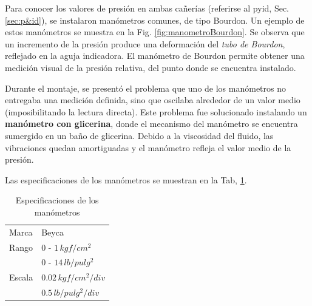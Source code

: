 Para conocer los valores de presión en ambas cañerías
(referirse al \gls{pyid}, Sec. \ref{sec:p&id}),
se instalaron manómetros comunes, de tipo Bourdon.
Un ejemplo de estos manómetros se muestra en la Fig. \ref{fig:manometroBourdon}.
Se observa que un incremento de la presión produce una deformación
del \emph{tubo de Bourdon}, reflejado en la aguja indicadora.
El manómetro de Bourdon permite obtener una medición visual de la
presión relativa, del punto donde se encuentra instalado.

Durante el montaje, se presentó el problema que uno de los manómetros
no entregaba una medición definida, sino que oscilaba alrededor de un
valor medio (imposibilitando la lectura directa).
Este problema fue solucionado instalando un \textbf{manómetro con glicerina},
donde el mecanismo del manómetro se encuentra sumergido en un baño de glicerina.
Debido a la viscosidad del fluido, las vibraciones quedan amortiguadas
y el manómetro refleja el valor medio de la presión.

Las especificaciones de los manómetros se muestran en la Tab,
\ref{tab:EspManoms}.

\begin{table}[ht]
\centering
\begin{tabular}{|l|l|}
\hline
Marca & Beyca\\
Rango & $0$ - $1\,kgf/cm^2$\\
 & $0$ - $14\,lb/pulg^2$\\
Escala & $0.02\,kgf/cm^2/div$\\
& $0.5\,lb/pulg^2/div$\\
\hline
\end{tabular}
\caption{Especificaciones de los manómetros}
\label{tab:EspManoms}
\end{table}

